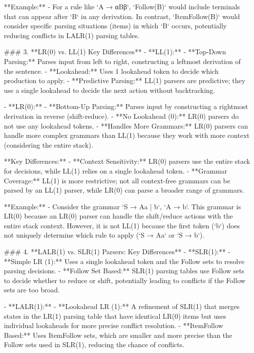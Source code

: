 **Example:**
- For a rule like `A → αBβ`, `Follow(B)` would include terminals that can appear after `B` in any derivation. In contrast, `ItemFollow(B)` would consider specific parsing situations (items) in which `B` occurs, potentially reducing conflicts in LALR(1) parsing tables.


### 3. **LR(0) vs. LL(1) Key Differences**
- **LL(1):**
  - **Top-Down Parsing:** Parses input from left to right, constructing a leftmost derivation of the sentence.
  - **Lookahead:** Uses 1 lookahead token to decide which production to apply.
  - **Predictive Parsing:** LL(1) parsers are predictive; they use a single lookahead to decide the next action without backtracking.

- **LR(0):**
  - **Bottom-Up Parsing:** Parses input by constructing a rightmost derivation in reverse (shift-reduce).
  - **No Lookahead (0):** LR(0) parsers do not use any lookahead tokens.
  - **Handles More Grammars:** LR(0) parsers can handle more complex grammars than LL(1) because they work with more context (considering the entire stack).

**Key Differences:**
- **Context Sensitivity:** LR(0) parsers use the entire stack for decisions, while LL(1) relies on a single lookahead token.
- **Grammar Coverage:** LL(1) is more restrictive; not all context-free grammars can be parsed by an LL(1) parser, while LR(0) can parse a broader range of grammars.

**Example:**
- Consider the grammar `S → Aa | b`, `A → b`. This grammar is LR(0) because an LR(0) parser can handle the shift/reduce actions with the entire stack context. However, it is not LL(1) because the first token (`b`) does not uniquely determine which rule to apply (`S → Aa` or `S → b`).


### 4. **LALR(1) vs. SLR(1) Parsers: Key Differences**
- **SLR(1):**
  - **Simple LR (1):** Uses a single lookahead token and the Follow sets to resolve parsing decisions.
  - **Follow Set Based:** SLR(1) parsing tables use Follow sets to decide whether to reduce or shift, potentially leading to conflicts if the Follow sets are too broad.

- **LALR(1):**
  - **Lookahead LR (1):** A refinement of SLR(1) that merges states in the LR(1) parsing table that have identical LR(0) items but uses individual lookaheads for more precise conflict resolution.
  - **ItemFollow Based:** Uses ItemFollow sets, which are smaller and more precise than the Follow sets used in SLR(1), reducing the chance of conflicts.

